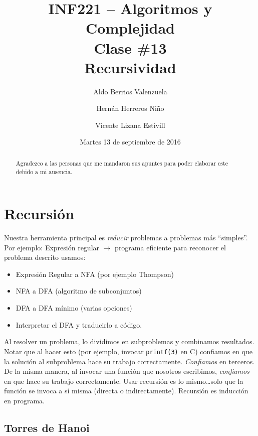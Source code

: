 \documentclass[english, spanish, fleqn, 10pt]{article}
\author{Aldo Berrios Valenzuela\and Hernán Herreros Niño\and Vicente Lizana Estivill}
\title{INF221 -- Algoritmos y Complejidad\\[.4\baselineskip]Clase \#13\\Recursividad}
\date{Martes 13 de septiembre de 2016}
\newcommand{\comillas}[1]{``#1''}
\numberwithin{equation}{section}
\theoremstyle{definition}
\begin{document}
\maketitle

\begin{abstract}
	Agradezco a las personas que me mandaron sus apuntes para poder elaborar este debido a mi ausencia.
\end{abstract}

\section{Recursión}
Nuestra herramienta principal es \emph{reducir} problemas a problemas más \comillas{simples}. Por ejemplo: Expresión regular $\rightarrow$ programa eficiente para reconocer el problema descrito usamos:
\begin{itemize}
	\item Expresión Regular a NFA (por ejemplo Thompson)
	
	\item NFA a DFA (algoritmo de subconjuntos)
	
	\item DFA a DFA mínimo (varias opciones)
	
	\item Interpretar el DFA y traducirlo a código.
\end{itemize}

Al resolver un problema, lo dividimos en subproblemas y combinamos resultados. Notar que al hacer esto (por ejemplo, invocar \texttt{printf(3)} en C) confiamos en que la solución al subproblema hace su trabajo correctamente. \emph{Confiamos} en terceros. De la misma manera, al invocar una función que nosotros escribimos, \emph{confiamos} en que hace su trabajo correctamente. Usar recursión es lo mismo\ldots solo que la función se invoca a sí misma (directa o indirectamente). Recursión es inducción en programa.

\subsection{Torres de Hanoi}
\end{document}
